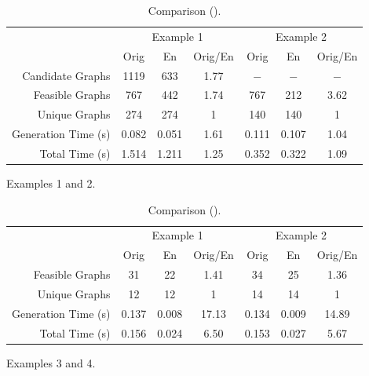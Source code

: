 \begin{table}[ht]
    \centering
    \begin{subfigure}[b]{\textwidth}
        \centering
        \caption{Examples 1 and 2.}
		\begin{tabular}{r | c | c | c | c | c | c}
		\hline \hline
		& \multicolumn{3}{c|}{Example 1} & \multicolumn{3}{c}{Example 2} \\
		& Orig & En & Orig/En & Orig & En & Orig/En \\
		\hline
		Candidate Graphs & 1119 & 633 & 1.77 & $-$ & $-$ & $-$ \\
		Feasible Graphs & 767 & 442 &  1.74 & 767 & 212 & 3.62 \\ 
		Unique Graphs & 274 & 274 & 1 & 140 & 140 & 1 \\
		Generation Time (s) & 0.082 & 0.051 & 1.61 & 0.111  & 0.107 & 1.04 \\
		Total Time (s) & 1.514 & 1.211 & 1.25 & 0.352 & 0.322 & 1.09 \\
		\hline \hline
		\end{tabular}
    \end{subfigure}

	\vspace{1ex}

    \begin{subfigure}[b]{\textwidth}
        \centering
        \caption{Examples 3 and 4.}
		\begin{tabular}{r | c | c | c | c | c | c}
		\hline \hline
		& \multicolumn{3}{c|}{Example 1} & \multicolumn{3}{c}{Example 2} \\
		& Orig & En & Orig/En & Orig & En & Orig/En \\
		\hline
		Feasible Graphs & 31 & 22 & 1.41 & 34 & 25 & 1.36 \\ 
		Unique Graphs & 12 & 12 & 1 & 14 & 14 & 1 \\
		Generation Time (s) & 0.137 & 0.008 & 17.13 & 0.134 & 0.009 & 14.89 \\
		Total Time (s) & 0.156 & 0.024 & 6.50 & 0.153 & 0.027 & 5.67 \\
		\hline \hline
		\end{tabular}
    \end{subfigure}

	\caption{Comparison ().\label{fig:app1:case-study-2}}

\end{table}

